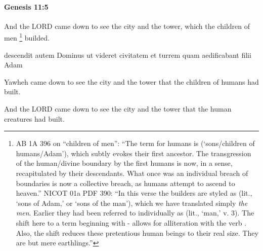 		\paragraph{Genesis 11:5} %
			\label{GENESIS-11-5}

			And the LORD came down to see the city and the tower, which the children of men%
				\footnote{%
					AB 1A 396 on ``children of men'': ``The term for humans is  (`sons/children of humans/Adam'), which subtly evokes their first ancestor. The transgression of the human/divine boundary by the first humans is now, in a sense, recapitulated by their descendants. What once was an individual breach of boundaries is now a collective breach, as humans attempt to ascend to heaven.'' NICOT 01a PDF 390: ``In this verse the builders are styled as  (lit., `sons of Adam,' or `sons of the man'), which we have translated simply \textit{the men}. Earlier they had been referred to individually as  (lit., `man,' v. 3). The shift here to a term beginning with - allows for alliteration with the verb . Also, the shift reduces these pretentious human beings to their real size. They are but mere earthlings.''
					}
			builded.

			\begin{framed}
			\scriptsize
				\begin{compactdesc}
					\item[BHS] 
					\item[LXX] 
					\item[BSV] descendit autem Dominus ut videret civitatem et turrem quam aedificabant filii Adam
					\item[AB 1A] Yawheh came down to see the city and the tower that the children of humans had built.
					\item[AHB] And the LORD came down to see the city and the tower that the human creatures had built.
				\end{compactdesc}
			\end{framed}

